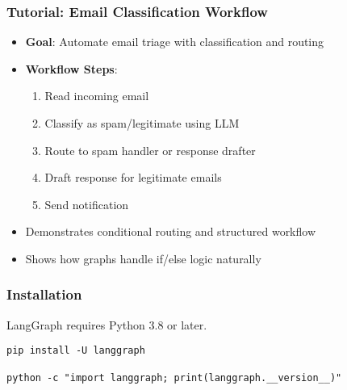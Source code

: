 \begin{frame}[fragile]\frametitle{Tutorial: Email Classification Workflow}
      \begin{itemize}
        \item \textbf{Goal}: Automate email triage with classification and routing
        \item \textbf{Workflow Steps}:
        \begin{enumerate}
            \item Read incoming email
            \item Classify as spam/legitimate using LLM
            \item Route to spam handler or response drafter
            \item Draft response for legitimate emails
            \item Send notification
        \end{enumerate}
        \item Demonstrates conditional routing and structured workflow
        \item Shows how graphs handle if/else logic naturally
      \end{itemize}
\end{frame}

\begin{frame}[fragile]\frametitle{Installation}
LangGraph requires Python 3.8 or later. 

      \begin{lstlisting}
pip install -U langgraph

python -c "import langgraph; print(langgraph.__version__)"
      \end{lstlisting}
\end{frame}


